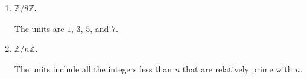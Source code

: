 \documentclass[a4paper,12pt]{article}
\begin{document}
\begin{enumerate}
\begin{enumerate}
            \item
                \boldmath
                \textbf{$\mathbb{Z} / 8\mathbb{Z}$.} \par
                \unboldmath
                The units are $1$, $3$, $5$, and $7$.

            \item
                \boldmath
                \textbf{$\mathbb{Z} / n\mathbb{Z}$.} \par
                \unboldmath
                The units include all the integers less than $n$ that are relatively prime with $n$.
        \end{enumerate}
\end{enumerate}
\end{document}
